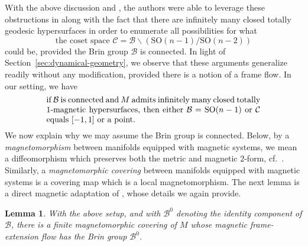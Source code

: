 \documentclass[10pt,a4paper]{amsart}
\newcommand{\SO}{\text{SO}}
\numberwithin{equation}{section}
\newtheorem{Lemma}[Theorem]{Lemma}
\theoremstyle{definition}
\begin{document}
 With the above discussion and \cite[Step 1 of proof of Theorem 3.1]{cekic2024ergodicity}, the authors were able to leverage these obstructions in \cite[Proposition 3.3.5]{filip2024finiteness} along with the fact that there are infinitely many closed totally geodesic hypersurfaces in order to enumerate all possibilities for what \begin{equation}\label{coset-space}\mbox{the coset space }\mathcal{C}= \mathcal{B} \backslash (\SO(n-1)/\SO(n-2))\end{equation} could be, provided the Brin group $\mathcal{B}$ is connected. In light of Section~\ref{sec:dynamical-geometry}, we observe that these arguments generalize readily without any modification, provided there is a notion of a frame flow. In our setting, we have \begin{equation}\label{Brin-dichotomy}
\parbox{.75\textwidth}{if $\mathcal{B}$ is connected and $M$ admits infinitely many closed totally $1$-magnetic hypersurfaces, then either $\mathcal{B} = \SO(n-1)$ or $\mathcal{C}$ equals $[-1,1]$ or a point.}
 \end{equation}
We now explain why we may assume the Brin group is connected. Below, by a \emph{magnetomorphism} between manifolds equipped with magnetic systems, we mean a diffeomorphism which preserves both the metric and magnetic $2$-form, cf.\ \cite[Section 1.1]{ABM_2025}. Similarly, a \emph{magnetomorphic covering} between manifolds equipped with magnetic systems is a covering map which is a local magnetomorphism. The next lemma is a direct magnetic adaptation of \cite[Lemma 3.3]{cekic2024ergodicity}, whose details
we again provide.

\begin{Lemma}\label{Brin-connected}
 With the above setup, and with $\mathcal{B}^0$ denoting the identity component of $\mathcal{B}$, there is a finite magnetomorphic covering of $M$ whose magnetic frame-extension flow has the Brin group $\mathcal{B}^0$.
\end{Lemma}
\end{document}
